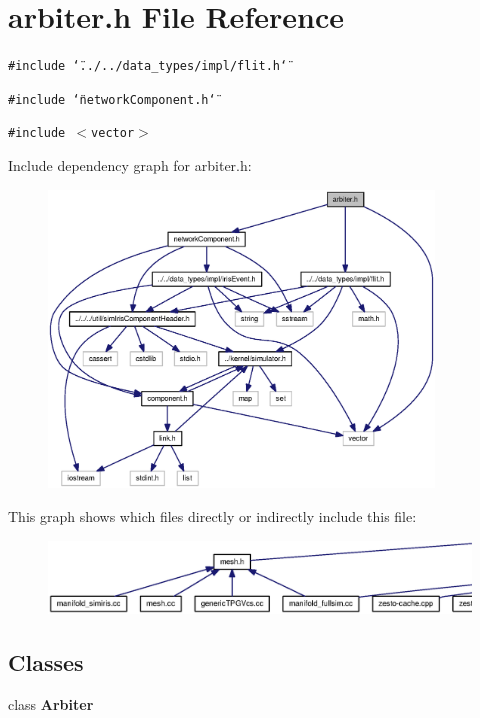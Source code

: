 \section{arbiter.h File Reference}
\label{arbiter_8h}
{\tt \#include \char`\"{}../../data\_\-types/impl/flit.h\char`\"{}}\par
{\tt \#include \char`\"{}networkComponent.h\char`\"{}}\par
{\tt \#include $<$vector$>$}\par


Include dependency graph for arbiter.h:\nopagebreak
\begin{figure}[H]
\begin{center}
\leavevmode
\includegraphics[width=290pt]{arbiter_8h__incl}
\end{center}
\end{figure}


This graph shows which files directly or indirectly include this file:\nopagebreak
\begin{figure}[H]
\begin{center}
\leavevmode
\includegraphics[width=420pt]{arbiter_8h__dep__incl}
\end{center}
\end{figure}
\subsection*{Classes}
\begin{CompactItemize}
\item 
class {\bf Arbiter}
\end{CompactItemize}
